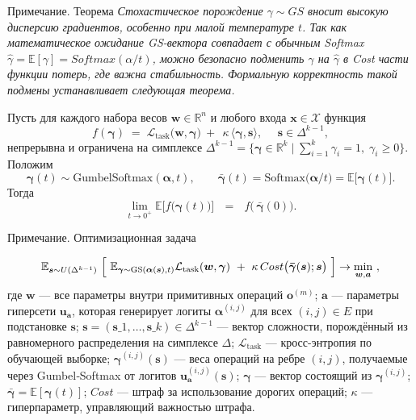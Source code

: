 \documentclass{beamer}
\begin{document}
\begin{frame}{Примечание.  Теорема}
\small
\textit{Стохастическое порождение $\gamma\sim GS$ вносит высокую дисперсию градиентов, особенно при малой температуре $t$. Так как математическое ожидание GS-вектора совпадает с обычным Softmax $\hat\gamma = \mathbb E[\gamma] = Softmax(\alpha/t)$, можно безопасно подменить $\gamma$ на $\hat\gamma$ в Cost части функции потерь, где важна стабильность. Формальную корректность такой подмены устанавливает следующая теорема.}

\begin{theorem}[Фирсов, 2025]
Пусть для каждого набора весов $\boldsymbol w\in\mathbb R^n$
и любого входа $\boldsymbol x\in\mathcal X$ функция
$$f(\boldsymbol\gamma)
   \;=\;
   \mathcal L_{\mathrm{task}}\!\bigl(\boldsymbol w,\boldsymbol\gamma\bigr)
    \ + \ \  \kappa\,\langle\boldsymbol\gamma,\boldsymbol s\rangle,
    \ \ \ \ \ \ \boldsymbol s\in\Delta^{k-1},$$
непрерывна и ограничена на симплексе
$\Delta^{k-1}
  =\bigl\{\boldsymbol\gamma\in\mathbb R^{k}\mid\sum_{i=1}^{k}\gamma_i=1,\;
          \gamma_i\ge 0\bigr\}$.
Положим
$$\boldsymbol\gamma(t)\sim\mathrm{GumbelSoftmax}(\boldsymbol\alpha,t),
   \qquad
   \boldsymbol{\bar\gamma}(t)=\mathrm{Softmax}\!\bigl(\boldsymbol\alpha/t\bigr)
               =\mathbb E\bigl[\boldsymbol\gamma(t)\bigr].$$
Тогда
$$\lim_{t\to 0^{+}}
       \mathbb E\bigl[f\bigl(\boldsymbol\gamma(t)\bigr)\bigr]
   \ \ \ = \ \ \ 
   f\!\bigl(\,\boldsymbol{\bar\gamma}(0)\bigr).$$
\end{theorem}

\end{frame}
\begin{frame}{Примечание. Оптимизационная задача}
    
$$
\mathbb E_{\boldsymbol s\sim U(\Delta^{k-1})} \ \Bigl[ \ {\mathbb E_{\boldsymbol\gamma\sim\mathrm{GS}(\boldsymbol\alpha(\boldsymbol s),t)} \mathcal L_{\text{task}}(\boldsymbol w,\boldsymbol\gamma)} \ +\  \kappa\,Cost\bigl(\boldsymbol{\bar\gamma}(\boldsymbol s);\boldsymbol s\bigr) \ \Bigr] \rightarrow \min_{\boldsymbol w,\boldsymbol a} \ , 
$$
где $\boldsymbol w$ --- все параметры внутри примитивных операций $\mathbf{o}^{(m)}$;
$\boldsymbol a$ --- параметры гиперсети $\boldsymbol{u}_{\boldsymbol a}$, которая генерирует логиты $\boldsymbol\alpha^{(i,j)}$ для всех $(i,j)\in E$ при подстановке $\boldsymbol{s}$;
$\boldsymbol{s} = (\boldsymbol{s}\_1,\dots,\boldsymbol{s}\_k)\in\Delta^{k-1}$ --- вектор сложности, порождённый из равномерного распределения на симплексе $\Delta$;
$\mathcal L_{\text{task}}$ --- кросс-энтропия по обучающей выборке;
$\boldsymbol\gamma^{(i,j)}(\boldsymbol{s})$ --- веса операций на ребре $(i,j)$, получаемые через Gumbel‐Softmax от логитов $\boldsymbol{u}_{\boldsymbol a}^{(i,j)}(\boldsymbol{s})$; 
$\boldsymbol\gamma$ --- вектор состоящий из $\boldsymbol\gamma^{(i,j)}$;
$\boldsymbol{\bar\gamma} = \mathbb E[\boldsymbol{\gamma}(t)]$; 
$Cost$ --- штраф за использование дорогих операций;
$\kappa$ --- гиперпараметр, управляющий важностью штрафа.

\end{frame}
\end{document}
